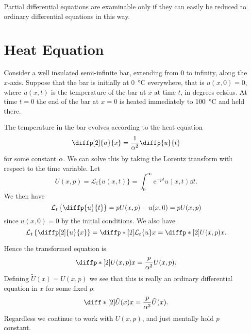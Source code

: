 \documentclass[fleqn]{NotesClass}
\newcommand*{\e}{\mathrm{e}}
\newcommand*{\laplaceTransform}{\mathcal{L}}
\begin{document}
    \begin{rmk}
        Partial differential equations are examinable only if they can easily be reduced to ordinary differential equations in this way.
    \end{rmk}
    
    \section{Heat Equation}
    Consider a well insulated semi-infinite bar, extending from \(0\) to infinity, along the \(x\)-axis.
    Suppose that the bar is initially at \qty{0}{\degreeCelsius} everywhere, that is \(u(x, 0) = 0\), where \(u(x, t)\) is the temperature of the bar at \(x\) at time \(t\), in degrees celsius.
    At time \(t = 0\) the end of the bar at \(x = 0\) is heated immediately to \qty{100}{\degreeCelsius} and held there.
    
    The temperature in the bar evolves according to the heat equation
    \begin{equation}
        \diffp[2]{u}{x} = \frac{1}{\alpha^2}\diffp{u}{t}
    \end{equation}
    for some constant \(\alpha\).
    We can solve this by taking the Lorentz transform with respect to the time variable.
    Let
    \begin{equation}
        U(x, p) = \laplaceTransform_t\{u(x, t)\} = \int_{0}^{\infty} \e^{-pt}u(x, t)\dd{t}.
    \end{equation}
    We then have
    \begin{equation}
        \laplaceTransform_{t} \left\{ \diffp{u}{t} \right\} = pU(x, p) - u(x, 0) = pU(x, p)
    \end{equation}
    since \(u(x, 0) = 0\) by the initial conditions.
    We also have
    \begin{equation}
        \laplaceTransform_t\left\{ \diffp[2]{u}{x} \right\} = \diffp*[2]{\laplaceTransform_{t} \{u\}}{x} = \diffp*[2]{U(x, p)}{x}.
    \end{equation}
    
    Hence the transformed equation is
    \begin{equation}
        \diffp*[2]{U(x, p)}{x} = \frac{p}{\alpha^2} U(x, p).
    \end{equation}
    Defining \(\tilde{U}(x) = U(x, p)\) we see that this is really an ordinary differential equation in \(x\) for some fixed \(p\):
    \begin{equation}
        \diff*[2]{\tilde{U}(x)}{x} = \frac{p}{\alpha^2}\tilde{U}(x).
    \end{equation}
    Regardless we continue to work with \(U(x, p)\), and just mentally hold \(p\) constant.
    
\end{document}
